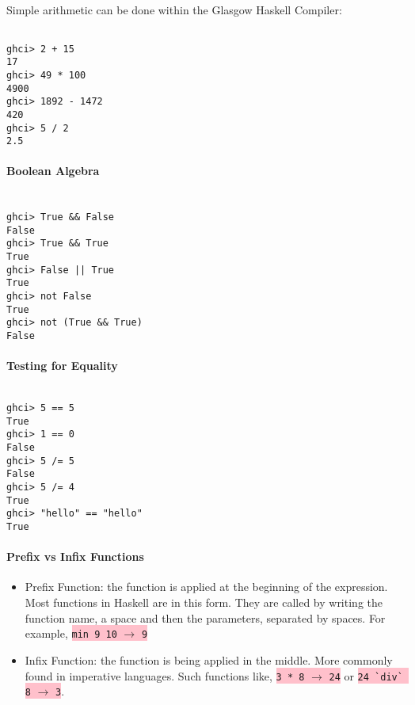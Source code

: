 \documentclass{article}
\begin{document}
\subparagraph{}

Simple arithmetic can be done within the Glasgow Haskell Compiler:

\begin{lstlisting}

ghci> 2 + 15
17
ghci> 49 * 100
4900
ghci> 1892 - 1472
420
ghci> 5 / 2
2.5

\end{lstlisting}

\paragraph{Boolean Algebra}

\subparagraph{}

\begin{lstlisting}

ghci> True && False
False
ghci> True && True
True
ghci> False || True
True
ghci> not False
True
ghci> not (True && True)
False

\end{lstlisting}

\paragraph{Testing for Equality}

\begin{lstlisting}

ghci> 5 == 5
True
ghci> 1 == 0
False
ghci> 5 /= 5
False
ghci> 5 /= 4
True
ghci> "hello" == "hello"
True

\end{lstlisting}

\paragraph{Prefix vs Infix Functions}

\begin{itemize}
    \item Prefix Function: the function is applied at the beginning of the expression. Most functions in Haskell are in this form. They are called by writing the function name, a space and then the parameters, separated by spaces. For example, \colorbox{pink}{ \lstinline{min 9 10} $\rightarrow$ \lstinline{9}}
    \item Infix Function: the function is being applied in the middle. More commonly found in imperative languages. Such functions like, \colorbox{pink}{ \lstinline{3 * 8} $\rightarrow$ \lstinline{24}} or \colorbox{pink}{ \lstinline{24 `div` 8} $\rightarrow$ \lstinline{3}}.
\end{itemize}
\end{document}
